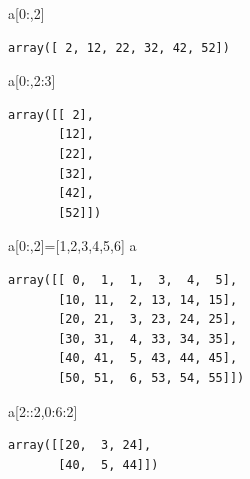\documentclass[
  a4paper,
  DIV=11,
  numbers=noendperiod]{scrreprt}
\newenvironment{Shaded}{\begin{snugshade}}{\end{snugshade}}
\newcommand{\DecValTok}[1]{\textcolor[rgb]{0.68,0.00,0.00}{#1}}
\newcommand{\NormalTok}[1]{\textcolor[rgb]{0.00,0.23,0.31}{#1}}
\newcommand{\OperatorTok}[1]{\textcolor[rgb]{0.37,0.37,0.37}{#1}}
\begin{document}
\begin{Shaded}
\begin{Highlighting}[]
\NormalTok{a[}\DecValTok{0}\NormalTok{:,}\DecValTok{2}\NormalTok{]}
\end{Highlighting}
\end{Shaded}

\begin{verbatim}
array([ 2, 12, 22, 32, 42, 52])
\end{verbatim}

\begin{Shaded}
\begin{Highlighting}[]
\NormalTok{a[}\DecValTok{0}\NormalTok{:,}\DecValTok{2}\NormalTok{:}\DecValTok{3}\NormalTok{]}
\end{Highlighting}
\end{Shaded}

\begin{verbatim}
array([[ 2],
       [12],
       [22],
       [32],
       [42],
       [52]])
\end{verbatim}

\begin{Shaded}
\begin{Highlighting}[]
\NormalTok{a[}\DecValTok{0}\NormalTok{:,}\DecValTok{2}\NormalTok{]}\OperatorTok{=}\NormalTok{[}\DecValTok{1}\NormalTok{,}\DecValTok{2}\NormalTok{,}\DecValTok{3}\NormalTok{,}\DecValTok{4}\NormalTok{,}\DecValTok{5}\NormalTok{,}\DecValTok{6}\NormalTok{]}
\NormalTok{a}
\end{Highlighting}
\end{Shaded}

\begin{verbatim}
array([[ 0,  1,  1,  3,  4,  5],
       [10, 11,  2, 13, 14, 15],
       [20, 21,  3, 23, 24, 25],
       [30, 31,  4, 33, 34, 35],
       [40, 41,  5, 43, 44, 45],
       [50, 51,  6, 53, 54, 55]])
\end{verbatim}

\begin{Shaded}
\begin{Highlighting}[]
\NormalTok{a[}\DecValTok{2}\NormalTok{::}\DecValTok{2}\NormalTok{,}\DecValTok{0}\NormalTok{:}\DecValTok{6}\NormalTok{:}\DecValTok{2}\NormalTok{]}
\end{Highlighting}
\end{Shaded}

\begin{verbatim}
array([[20,  3, 24],
       [40,  5, 44]])
\end{verbatim}
\end{document}
